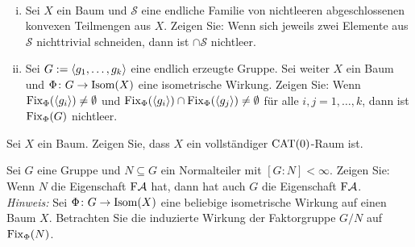 	\begin{aufgabe}
		\label{aufg:7.2}
		\mbox{} \\[-1.4cm]
		\begin{enumerate}[(i)]
			\item Sei $X$ ein Baum und $\mathcal{S}$ eine endliche Familie von nichtleeren abgeschlossenen konvexen Teilmengen aus $X$.
			Zeigen Sie:
			Wenn sich jeweils zwei Elemente aus $\mathcal{S}$ nichttrivial schneiden, dann ist $\cap \mathcal{S}$ nichtleer.
			\item Sei $G:= \langle g_1,\dots,g_k\rangle$ eine endlich erzeugte Gruppe.
			Sei weiter $X$ ein Baum und $\Phi \colon G \rightarrow \operatorname{Isom}(X)$ eine isometrische Wirkung.
			Zeigen Sie:
			Wenn $\operatorname{Fix}_\Phi(\langle g_i\rangle) \neq \emptyset$ und $\operatorname{Fix}_\Phi(\langle g_i\rangle) \cap \operatorname{Fix}_\Phi(\langle g_j\rangle) \neq \emptyset$ für alle $i,j = 1,\dots,k$, dann ist $\operatorname{Fix}_\Phi(G)$ nichtleer.
		\end{enumerate}
	\end{aufgabe}
	
	\begin{aufgabe}
		\label{aufg:7.3}
		Sei $X$ ein Baum.
		Zeigen Sie, dass $X$ ein vollständiger $\operatorname{CAT(0)}$-Raum ist.
	\end{aufgabe}
	
	\begin{aufgabe}
		\label{aufg:7.4}
		Sei $G$ eine Gruppe und $N \subseteq G$ ein Normalteiler mit $[G : N] < \infty$.
		Zeigen Sie:
		Wenn $N$ die Eigenschaft $\text{F}\mathcal{A}$ hat, dann hat auch $G$ die Eigenschaft $\text{F}\mathcal{A}$. \\
		\textit{Hinweis:} Sei $\Phi\colon G \rightarrow \operatorname{Isom}(X)$ eine beliebige isometrische Wirkung auf einen Baum $X$.
		Betrachten Sie die induzierte Wirkung der Faktorgruppe $G/N$ auf $\operatorname{Fix}_\Phi(N)$.
	\end{aufgabe}